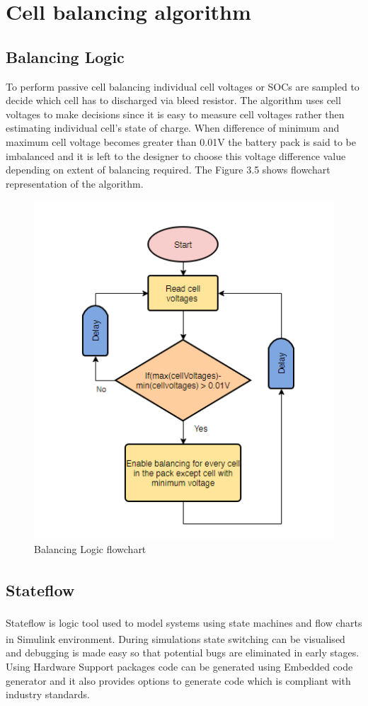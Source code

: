 \section{Cell balancing algorithm }
\subsection{Balancing Logic}
To perform passive cell balancing individual cell voltages or SOCs are sampled to decide which cell has to discharged via bleed resistor. The algorithm uses cell voltages to make decisions since it is easy to measure cell voltages rather then estimating individual cell's state of charge. When difference of minimum and maximum cell voltage becomes greater than 0.01V the battery pack is said to be imbalanced and it is left to the designer to choose this voltage difference value depending on extent of balancing required. The Figure 3.5 shows flowchart representation of the algorithm.

\begin{figure}[H]
    \centering
    \includegraphics[]{Chapter3/Figures/logic.PNG}
    \caption{Balancing Logic flowchart}
\end{figure}

\subsection{Stateflow\textsuperscript{\textregistered}}
Stateflow\textsuperscript{\textregistered} is logic tool used to model systems using state machines and flow charts in Simulink\textsuperscript{\textregistered} environment. During simulations state switching can be visualised and debugging is made easy so that potential bugs are eliminated in early stages. Using Hardware Support packages code can be generated using Embedded code generator and it also provides options to generate code which is compliant with industry standards.



